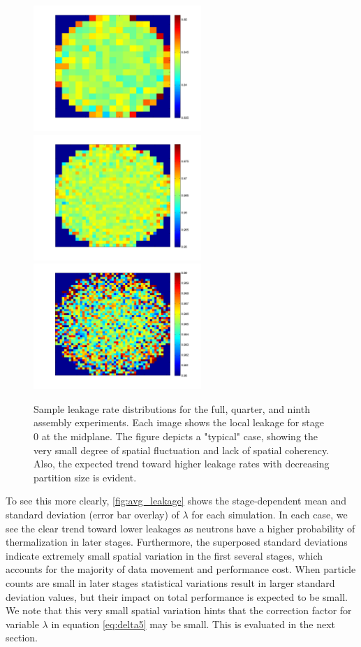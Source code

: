 \begin{figure}[ht!]
  \centering
  \includegraphics[width=2.5in]{figures/ch5/leakage_map1.png}
  \includegraphics[width=2.5in]{figures/ch5/leakage_map1_4.png}
  \includegraphics[width=2.5in]{figures/ch5/leakage_map1_9.png}
  \caption{Sample leakage rate distributions for the full, quarter, and ninth
    assembly experiments. Each image shows the local leakage for stage 0 at the
    midplane. The figure depicts a "typical" case, showing the very small degree
    of spatial fluctuation and lack of spatial coherency. Also, the expected
    trend toward higher leakage rates with decreasing partition size is
    evident.}
  \label{fig:leakage_maps}
\end{figure}

To see this more clearly, \autoref{fig:avg_leakage} shows the stage-dependent
mean and standard deviation (error bar overlay) of $\lambda$ for each
simulation.  In each case, we see the clear trend toward lower leakages as
neutrons have a higher probability of thermalization in later stages.
Furthermore, the superposed standard deviations indicate extremely small spatial
variation in the first several stages, which accounts for the majority of data
movement and performance cost. When particle counts are small in later stages
statistical variations result in larger standard deviation values, but their
impact on total performance is expected to be small. We note that this very
small spatial variation hints that the correction factor for variable $\lambda$
in equation \eqref{eq:delta5} may be small. This is evaluated in the next
section.

